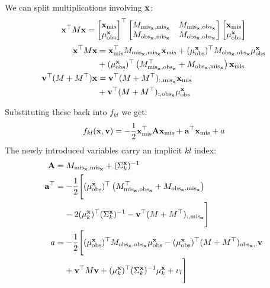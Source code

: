 \documentclass[letterpaper]{article}
\newcommand{\tp}{\top}
\newcommand{\vx}{{\bf x}}
\newcommand{\vv}{{\bf v}}
\newcommand{\va}{{\bf a}}
\newcommand{\vA}{{\bf A}}
\newcommand{\mis}{\text{mis}}
\newcommand{\obs}{\text{obs}}
\newcommand{\misx}{{\text{mis}_\vx}}
\newcommand{\obsx}{{\text{obs}_\vx}}
\begin{document}
We can split multiplications involving $\vx$:
\begin{equation*}
\vx^\tp M \vx =
\begin{bmatrix}\vx_\mis \\ \mu^\vx_\obs\end{bmatrix}^\tp
\begin{bmatrix} M_{\misx,\misx} & M_{\misx,\obsx} \\
M_{\obsx,\misx} & M_{\obsx,\obsx}
\end{bmatrix}
\begin{bmatrix}\vx_\mis \\ \mu^\vx_\obs\end{bmatrix}
\end{equation*}
\begin{equation*}
\begin{aligned}
\vx^\tp M \vx &= \vx_\mis^\tp M_{\misx,\misx}\vx_\mis + (\mu^\vx_\obs)^\tp M_{\obsx,\obsx}\mu^\vx_\obs \\
&+ (\mu^\vx_\obs)^\tp \left(M_{\misx,\obsx}^\tp + M_{\obsx,\misx} \right)\vx_\mis  \\
\vv^\tp(M + M^\tp) \vx &= \vv^\tp(M + M^\tp)_{:,\misx} \vx_\mis \\
&+ \vv^\tp(M + M^\tp)_{:,\obsx} \mu^\vx_\obs
\end{aligned}
\end{equation*}

Substituting these back into $f_{kl}$ we get:
\begin{equation*}
  f_{kl}(\vx, \vv) = -\frac{1}{2}\vx_\mis^\tp \vA \vx_\mis + \va^\tp \vx_\mis + a
\end{equation*}
The newly introduced variables carry an implicit $kl$ index:
\begin{equation*}
\begin{aligned}
\vA &= M_{\misx,\misx} + (\Sigma_k^\vx)^{-1} \\
\va^\tp &= -\frac{1}{2}\Bigg[(\mu^\vx_\obs)^\tp \left(M_{\misx,\obsx}^\tp + M_{\obsx,\misx} \right) \\
&\hspace{1.1em}- 2 (\mu_k^\vx)^\tp (\Sigma_k^\vx)^{-1} - \vv^\tp(M + M^\tp)_{:,\misx} \Bigg] \\
a &= -\frac{1}{2} \Bigg[ (\mu^\vx_\obs)^\tp M_{\obsx,\obsx}\mu^\vx_\obs - (\mu^\vx_\obs)^\tp(M + M^\tp)_{\obsx,:} \vv \\
&\hspace{1.1em} + \vv^\tp M \vv + (\mu_k^\vx)^\tp (\Sigma_k^\vx)^{-1} \mu_k^\vx + v_l \Bigg]
\end{aligned}
\end{equation*}
\end{document}
